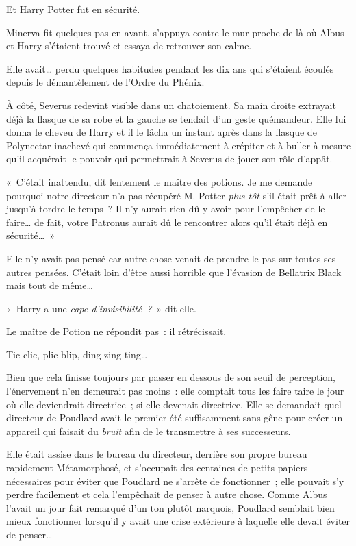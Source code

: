 Et Harry Potter fut en sécurité.

Minerva fit quelques pas en avant, s'appuya contre le mur proche de là où Albus et Harry s'étaient trouvé et essaya de retrouver son calme.

Elle avait… perdu quelques habitudes pendant les dix ans qui s'étaient écoulés depuis le démantèlement de l'Ordre du Phénix.

À côté, Severus redevint visible dans un chatoiement.
Sa main droite extrayait déjà la flasque de sa robe et la gauche se tendait d'un geste quémandeur.
Elle lui donna le cheveu de Harry et il le lâcha un instant après dans la flasque de Polynectar inachevé qui commença immédiatement à crépiter et à buller à mesure qu'il acquérait le pouvoir qui permettrait à Severus de jouer son rôle d'appât.

«~C'était inattendu, dit lentement le maître des potions.
Je me demande pourquoi notre directeur n'a pas récupéré M. Potter \emph{plus tôt} s'il était prêt à aller jusqu'à tordre le temps~?
Il n'y aurait rien dû y avoir pour l'empêcher de le faire… de fait, votre Patronus aurait dû le rencontrer alors qu'il était déjà en sécurité…~»

Elle n'y avait pas pensé car autre chose venait de prendre le pas sur toutes ses autres pensées.
C'était loin d'être aussi horrible que l'évasion de Bellatrix Black mais tout de même…

«~Harry a une \emph{cape d'invisibilité~?}~» dit-elle.

Le maître de Potion ne répondit pas~: il rétrécissait.

\later

Tic-clic, plic-blip, ding-zing-ting…

Bien que cela finisse toujours par passer en dessous de son seuil de perception, l'énervement n'en demeurait pas moins~: elle comptait tous les faire taire le jour où elle deviendrait directrice~; si elle devenait directrice.
Elle se demandait quel directeur de Poudlard avait le premier été suffisamment sans gêne pour créer un appareil qui faisait du \emph{bruit} afin de le transmettre à ses successeurs.

Elle était assise dans le bureau du directeur, derrière son propre bureau rapidement Métamorphosé, et s'occupait des centaines de petits papiers nécessaires pour éviter que Poudlard ne s'arrête de fonctionner~; elle pouvait s'y perdre facilement et cela l'empêchait de penser à autre chose.
Comme Albus l'avait un jour fait remarqué d'un ton plutôt narquois, Poudlard semblait bien mieux fonctionner lorsqu'il y avait une crise extérieure à laquelle elle devait éviter de penser…

